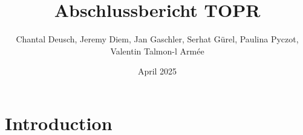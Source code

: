 \documentclass{article}
\title{Abschlussbericht TOPR}
\author{Chantal Deusch, Jeremy Diem, Jan Gaschler, Serhat Gürel, Paulina Pyczot, Valentin Talmon-l Armée}
\date{April 2025}
\begin{document}
\maketitle

\section{Introduction}
\end{document}

